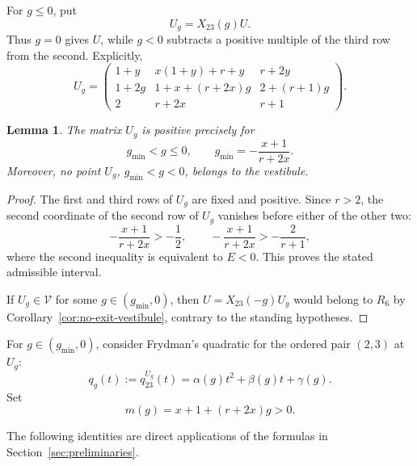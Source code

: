 \documentclass[11pt,onecolumn]{amsart}
\theoremstyle{plain}
\newtheorem{lemma}[theorem]{Lemma}
\theoremstyle{definition}
\theoremstyle{remark}
\newcommand{\V}{\mathcal V}
\begin{document}
For $g\leq0$, put
\[
U_g=X_{23}(g)U.
\]
Thus $g=0$ gives $U$, while $g<0$ subtracts a positive
multiple of the third row from the second.  Explicitly,
\[
U_g=
\begin{pmatrix}
1+y & x(1+y)+r+y & r+2y\\
1+2g & 1+x+(r+2x)g & 2+(r+1)g\\
2 & r+2x & r+1
\end{pmatrix}.
\]

\begin{lemma}
\label{lem:outer-admissible-interval}
The matrix $U_g$ is positive precisely for
\[
g_{\min}<g\leq0,
\qquad
g_{\min}=-\frac{x+1}{r+2x}.
\]
Moreover, no point $U_g$, $g_{\min}<g<0$, belongs to the
vestibule.
\end{lemma}

\begin{proof}
The first and third rows of $U_g$ are fixed and positive.  Since $r>2$, the
second coordinate of the second  row of $U_g$ vanishes before either of the
other two:
\[
-\frac{x+1}{r+2x}>-\frac12,
\qquad
-\frac{x+1}{r+2x}>-\frac{2}{r+1},
\]
where the second inequality is equivalent to $E<0$.  This proves
the stated admissible interval.

If $U_g\in\V$ for some $g\in(g_{\min},0)$, then
$U=X_{23}(-g)U_g$ would belong to $R_6$ by Corollary~\ref{cor:no-exit-vestibule}, contrary to the
standing hypotheses.
\end{proof}


For $g\in(g_{\min},0)$, consider Frydman's quadratic for the
ordered pair $(2,3)$ at $U_g$:
\[
q_g(t):=q_{23}^{U_g}(t)
=\alpha(g)t^2+\beta(g)t+\gamma(g).
\]
Set
\[
m(g)=x+1+(r+2x)g>0.
\]

The following identities are direct applications of the formulas in
Section~\ref{sec:preliminaries}.
\end{document}
